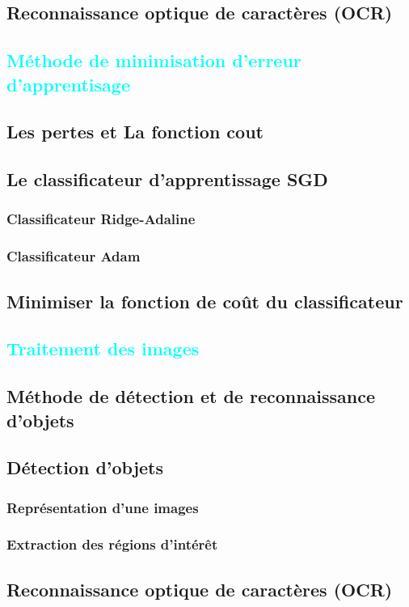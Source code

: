 \section{Reconnaissance optique de caractères (OCR)}
\lipsum[1]


\textcolor{cyan}{\chapter{Méthode de minimisation d'erreur d'apprentisage}}
	\section{Les pertes et La fonction cout}
	\lipsum[1]
	\section{Le classificateur d'apprentissage SGD}
	\subsection{Classificateur Ridge-Adaline}
	\lipsum[1]
	\subsection{Classificateur Adam}
	\lipsum[1]
	
	\section{Minimiser la fonction de coût du classificateur}
	\lipsum[1]
	\lipsum[2]


\textcolor{cyan}{\chapter{Traitement des images}}

	\section{Méthode de détection et de reconnaissance d'objets}
	\lipsum[1]
	
	\section{Détection d'objets }
	\subsection{Représentation d'une images}
	\lipsum[1]
	\lipsum[2]
	
	\subsection{Extraction des régions d'intérêt}
	\lipsum[1]
	
	\section{Reconnaissance optique de caractères (OCR)}
	\lipsum[1]

